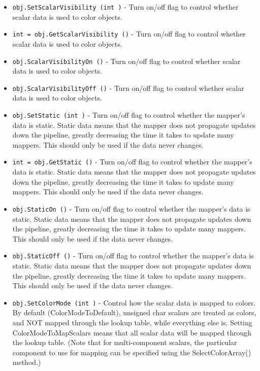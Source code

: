 \begin{itemize}
\item  \verb|obj.SetScalarVisibility (int )| -  Turn on/off flag to control whether scalar data is used to color objects.

\item  \verb|int = obj.GetScalarVisibility ()| -  Turn on/off flag to control whether scalar data is used to color objects.

\item  \verb|obj.ScalarVisibilityOn ()| -  Turn on/off flag to control whether scalar data is used to color objects.

\item  \verb|obj.ScalarVisibilityOff ()| -  Turn on/off flag to control whether scalar data is used to color objects.

\item  \verb|obj.SetStatic (int )| -  Turn on/off flag to control whether the mapper's data is static. Static data
 means that the mapper does not propagate updates down the pipeline, greatly
 decreasing the time it takes to update many mappers. This should only be
 used if the data never changes.

\item  \verb|int = obj.GetStatic ()| -  Turn on/off flag to control whether the mapper's data is static. Static data
 means that the mapper does not propagate updates down the pipeline, greatly
 decreasing the time it takes to update many mappers. This should only be
 used if the data never changes.

\item  \verb|obj.StaticOn ()| -  Turn on/off flag to control whether the mapper's data is static. Static data
 means that the mapper does not propagate updates down the pipeline, greatly
 decreasing the time it takes to update many mappers. This should only be
 used if the data never changes.

\item  \verb|obj.StaticOff ()| -  Turn on/off flag to control whether the mapper's data is static. Static data
 means that the mapper does not propagate updates down the pipeline, greatly
 decreasing the time it takes to update many mappers. This should only be
 used if the data never changes.

\item  \verb|obj.SetColorMode (int )| -  Control how the scalar data is mapped to colors.  By default
 (ColorModeToDefault), unsigned char scalars are treated as colors, and
 NOT mapped through the lookup table, while everything else is. Setting
 ColorModeToMapScalars means that all scalar data will be mapped through
 the lookup table.  (Note that for multi-component scalars, the
 particular component to use for mapping can be specified using the
 SelectColorArray() method.)


\end{itemize}
